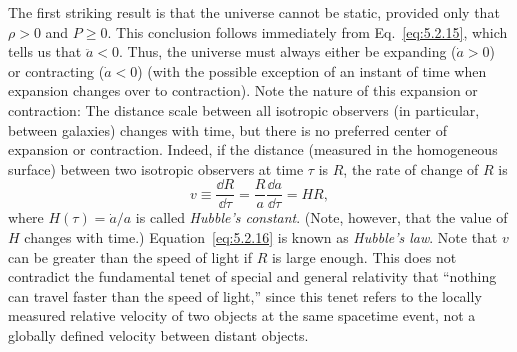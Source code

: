 The first striking result is that the universe cannot be static, provided only that
\(\rho>0\) and \(P\geq0\). This conclusion follows immediately from
Eq.~\eqref{eq:5.2.15}, which tells us that \(\ddot a<0\). Thus, the universe must
always either be expanding (\(\dot a>0\)) or contracting (\(\dot a<0\)) (with the
possible exception of an instant of time when expansion changes over to contraction).
Note the nature of this expansion or contraction: The distance scale between all
isotropic observers (in particular, between galaxies) changes with time, but there is
no preferred center of expansion or contraction. Indeed, if the distance (measured in
the homogeneous surface) between two isotropic observers at time \(\tau\) is \(R\),
the rate of change of \(R\) is
\begin{equation}
  v\equiv\frac{\dd R}{\dd\tau}=\frac{R}{a}\frac{\dd a}{\dd\tau}=HR,
  \tag{5.2.16}\label{eq:5.2.16}
\end{equation}
where \(H(\tau)=\dot a/a\) is called \emph{Hubble's constant}. (Note, however,
that the value of \(H\) changes with time.) Equation~\eqref{eq:5.2.16} is known as
\emph{Hubble's law}. Note that \(v\) can be greater than the speed of light if \(R\)
is large enough. This does not contradict the fundamental tenet of special and general
relativity that ``nothing can travel faster than the speed of light,'' since this tenet
refers to the locally measured relative velocity of two objects at the same spacetime
event, not a globally defined velocity between distant objects.

